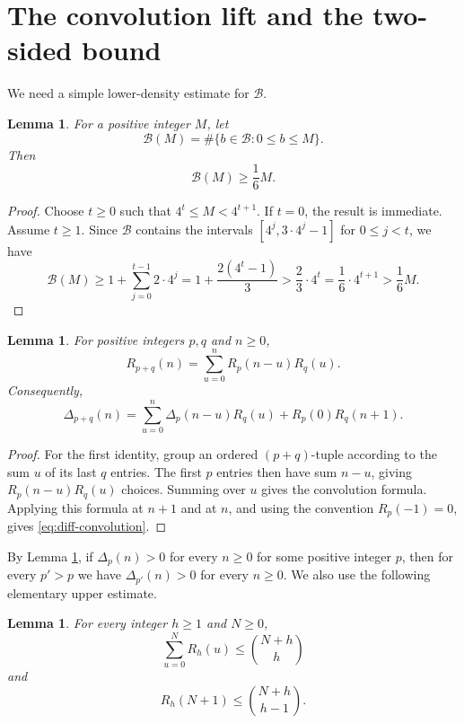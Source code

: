 \documentclass[10pt,a4paper]{amsart}
\newtheorem{lemma}[theorem]{Lemma}
\newcommand{\BaseB}{\mathcal B}
\begin{document}
\section{The convolution lift and the two-sided bound}

We need a simple lower-density estimate for $\BaseB$.

\begin{lemma}\label{lem:density}
For a positive integer $M$, let
\[
\BaseB(M)=\#\{b\in \BaseB:0\le b\le M\}.
\]
Then
\[\BaseB(M)\ge \frac16 M.
\]
\end{lemma}

\begin{proof}
Choose $t\ge 0$ such that $4^t\le M<4^{t+1}$. If $t=0$, the result is immediate. Assume $t\ge 1$. Since $\BaseB$ contains the intervals $[4^j,3\cdot 4^j-1]$ for $0\le j<t$, we have
\[\BaseB(M)\ge 1+\sum_{j=0}^{t-1}2\cdot 4^j=1+\frac{2(4^t-1)}3>\frac23 \cdot4^t=\frac16 \cdot4^{t+1}>\frac16 M.
\]
\end{proof}

\begin{lemma}\label{lem:convolution}
For positive integers $p,q$ and $n\ge 0$,
\[
R_{p+q}(n)=\sum_{u=0}^n R_p(n-u)R_q(u).
\]
Consequently,
\begin{equation}\label{eq:diff-convolution}
\Delta_{p+q}(n)=\sum_{u=0}^n \Delta_p(n-u)R_q(u)+R_p(0)R_q(n+1).
\end{equation}
\end{lemma}

\begin{proof}
For the first identity, group an ordered $(p+q)$-tuple according to the sum $u$ of its last $q$ entries. The first $p$ entries then have sum $n-u$, giving $R_p(n-u)R_q(u)$ choices. Summing over $u$ gives the convolution formula. Applying this formula at $n+1$ and at $n$, and using the convention $R_p(-1)=0$, gives \eqref{eq:diff-convolution}.
\end{proof}

By Lemma \ref{lem:convolution}, if $\Delta _p(n)>0$ for every $n\ge 0$ for some positive integer $p$, then for every $p'>p$ we have $\Delta _{p'}(n)>0$ for every $n\ge 0$. We also use the following elementary upper estimate.

\begin{lemma}\label{lem:upper-elementary}
For every integer $h\ge 1$ and $N\ge 0$,
\[
\sum_{u=0}^N R_h(u)\le \binom{N+h}{h}
\]
and
\[
R_h(N+1)\le \binom{N+h}{h-1}.
\]
\end{lemma}
\end{document}
